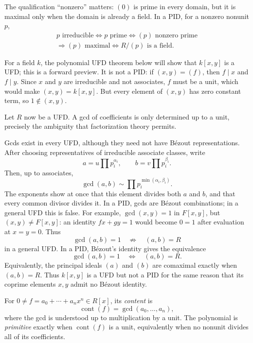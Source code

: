 The qualification ``nonzero'' matters: \((0)\) is prime in every domain,
but it is maximal only when the domain is already a field. In a PID, for a
nonzero nonunit \(p\),
\[
\begin{array}{c}
p\text{ irreducible}\Longleftrightarrow p\text{ prime}
\Longleftrightarrow(p)\text{ nonzero prime}\\
\Longrightarrow(p)\text{ maximal}
\Longleftrightarrow R/(p)\text{ is a field}.
\end{array}
\]

\begin{example}
For a field \(k\), the polynomial UFD theorem below will show that \(k[x,y]\)
is a UFD; this is a forward preview.  It is not a PID: if \((x,y)=(f)\), then \(f\mid x\) and
\(f\mid y\).  Since \(x\) and \(y\) are irreducible and not associates,
\(f\) must be a unit, which would make \((x,y)=k[x,y]\).  But every element
of \((x,y)\) has zero constant term, so \(1\notin(x,y)\).
\end{example}

Let \(R\) now be a UFD.  A gcd of coefficients is only determined up to a
unit, precisely the ambiguity that factorization theory permits.

Gcds exist in every UFD, although they need not have B\'ezout
representations.  After choosing representatives of irreducible associate
classes, write
\[a=u\prod p_i^{\alpha_i},\qquad b=v\prod p_i^{\beta_i}.\]
Then, up to associates,
\[\gcd(a,b)\sim\prod p_i^{\min(\alpha_i,\beta_i)}.\]
The exponents show at once that this element divides both \(a\) and \(b\),
and that every common divisor divides it.  In a PID, gcds are B\'ezout
combinations; in a general UFD this is false.  For example,
\(\gcd(x,y)=1\) in \(F[x,y]\), but \((x,y)\ne F[x,y]\): an identity
\(fx+gy=1\) would become \(0=1\) after evaluation at \(x=y=0\).
Thus
\[
\gcd(a,b)=1\quad\not\Rightarrow\quad(a,b)=R
\]
in a general UFD.  In a PID, B\'ezout's identity gives the equivalence
\[\gcd(a,b)=1\quad\Longleftrightarrow\quad(a,b)=R.\]
Equivalently, the principal ideals \((a)\) and \((b)\) are comaximal exactly
when \((a,b)=R\).  Thus \(k[x,y]\) is a UFD but not a PID for the same reason
that its coprime elements \(x,y\) admit no B\'ezout identity.

\begin{definition}[Content]
For \(0\ne f=a_0+\cdots+a_nx^n\in R[x]\), its \emph{content} is
\[\operatorname{cont}(f)=\gcd(a_0,\ldots,a_n),\]
where the gcd is understood up to multiplication by a unit.  The polynomial
is \emph{primitive} exactly when \(\operatorname{cont}(f)\) is a unit,
equivalently when no nonunit divides all of its coefficients.
\end{definition}

